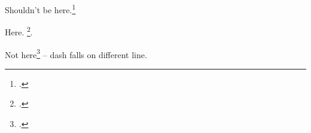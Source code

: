 \documentclass{article}
\begin{document}
Shouldn't be here.\footcite[][fig.~1]{abc}

Here.%
	\footcite{abc}.

Not here\footcite{abc}
-- dash falls on different line.
\end{document}
